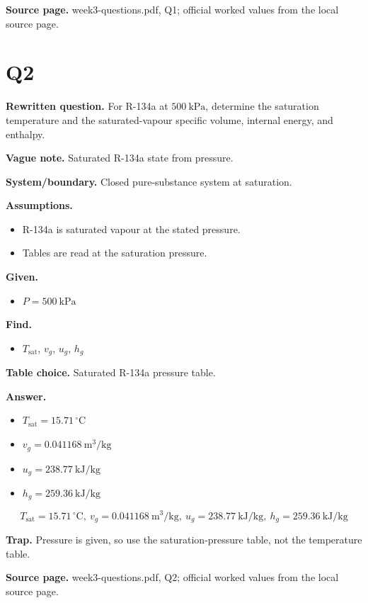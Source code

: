 \textbf{Source page.} week3-questions.pdf, Q1; official worked values from the local source page.

\section*{Q2}
\textbf{Rewritten question.} For R-134a at $500\ \mathrm{kPa}$, determine the saturation temperature and the saturated-vapour specific volume, internal energy, and enthalpy.

\textbf{Vague note.} Saturated R-134a state from pressure.

\textbf{System/boundary.} Closed pure-substance system at saturation.

\textbf{Assumptions.}
\begin{itemize}
  \item R-134a is saturated vapour at the stated pressure.
  \item Tables are read at the saturation pressure.
\end{itemize}

\textbf{Given.}
\begin{itemize}
  \item $P = 500\ \mathrm{kPa}$
\end{itemize}

\textbf{Find.}
\begin{itemize}
  \item $T_{\mathrm{sat}}$, $v_g$, $u_g$, $h_g$
\end{itemize}

\textbf{Table choice.} Saturated R-134a pressure table.

\textbf{Answer.}
\begin{itemize}
  \item $T_{\mathrm{sat}} = 15.71\,^{\circ}\mathrm{C}$
  \item $v_g = 0.041168\ \mathrm{m^3/kg}$
  \item $u_g = 238.77\ \mathrm{kJ/kg}$
  \item $h_g = 259.36\ \mathrm{kJ/kg}$
\end{itemize}

\[\boxed{T_{\mathrm{sat}} = 15.71\,^{\circ}\mathrm{C},\ v_g = 0.041168\ \mathrm{m^3/kg},\ u_g = 238.77\ \mathrm{kJ/kg},\ h_g = 259.36\ \mathrm{kJ/kg}}\]

\textbf{Trap.} Pressure is given, so use the saturation-pressure table, not the temperature table.

\textbf{Source page.} week3-questions.pdf, Q2; official worked values from the local source page.

